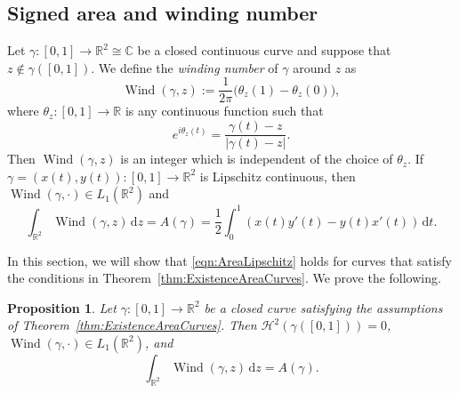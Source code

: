 \documentclass[12pt,reqno]{amsart}
\newcommand{\ud}[0]{\,\mathrm{d}}
\newcommand{\from}{\colon}
\newtheorem{prop}[thm]{Proposition}
\theoremstyle{remark}
\newcommand{\0}{\mathbf{0}}
\renewcommand{\1}{\mathbf 1}
\DeclareMathOperator{\Wind}{Wind}
\begin{document}
\subsection{Signed area and winding number}\label{rem:H20}
Let $\gamma\from[0,1]\to\mathbb R^2 \cong \mathbb{C}$ be a closed continuous curve and suppose that 
$z\notin \gamma([0,1])$. We define the \emph{winding number} of $\gamma$ around $z$ as
\[
\Wind(\gamma,z)
:=\frac{1}{2\pi}\big(\theta_z(1)-\theta_z(0)\big),
\]
where $\theta_z\from[0,1]\to\mathbb R$ is any continuous function such that
$$e^{i\theta_z(t)}=\frac{\gamma(t)-z}{|\gamma(t)-z|}.$$
Then $\Wind(\gamma,z)$ is an integer which is independent of the choice of $\theta_z$. If $\gamma=(x(t),y(t))\from[0,1]\to\mathbb R^2$ is Lipschitz continuous, then 
$\Wind(\gamma,\cdot)\in L_1(\mathbb R^2)$ and 
\begin{equation}\label{eqn:AreaLipschitz}
\int_{\mathbb R^2} \Wind(\gamma,z)\ud z
= A(\gamma) =
\frac12 \int_0^1 \left(x(t)y'(t)-y(t)x'(t)\right)\ud t.
\end{equation}

In this section, we will show that \eqref{eqn:AreaLipschitz} holds for curves that satisfy the conditions in Theorem~\ref{thm:ExistenceAreaCurves}. We prove the following.  

\begin{prop}\label{prop:winding}
    Let $\gamma\from[0,1]\to\mathbb R^2$ be a closed curve satisfying the assumptions of Theorem~\ref{thm:ExistenceAreaCurves}. Then $\mathcal{H}^2(\gamma([0,1]))=0$,  $\Wind(\gamma,\cdot)\in L_1(\mathbb R^2)$, and 
    \begin{equation}\label{eq:wind-integral}
      \int_{\mathbb R^2}\Wind(\gamma,z)\ud z = A(\gamma).
    \end{equation}
      
\end{prop}
\end{document}
